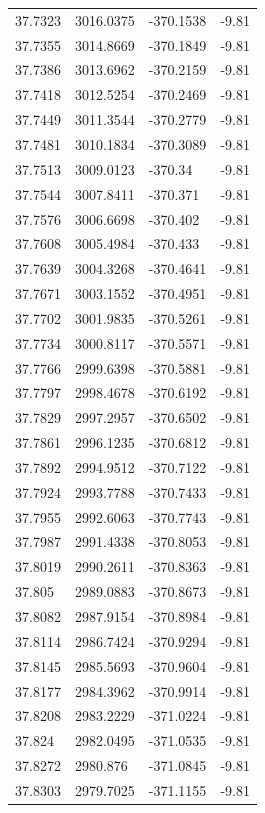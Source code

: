 \begin{table}[H]
\begin{tabular}{llll}
37.7323 & 3016.0375 & -370.1538 & -9.81 \\
37.7355 & 3014.8669 & -370.1849 & -9.81 \\
37.7386 & 3013.6962 & -370.2159 & -9.81 \\
37.7418 & 3012.5254 & -370.2469 & -9.81 \\
37.7449 & 3011.3544 & -370.2779 & -9.81 \\
37.7481 & 3010.1834 & -370.3089 & -9.81 \\
37.7513 & 3009.0123 & -370.34 & -9.81 \\
37.7544 & 3007.8411 & -370.371 & -9.81 \\
37.7576 & 3006.6698 & -370.402 & -9.81 \\
37.7608 & 3005.4984 & -370.433 & -9.81 \\
37.7639 & 3004.3268 & -370.4641 & -9.81 \\
37.7671 & 3003.1552 & -370.4951 & -9.81 \\
37.7702 & 3001.9835 & -370.5261 & -9.81 \\
37.7734 & 3000.8117 & -370.5571 & -9.81 \\
37.7766 & 2999.6398 & -370.5881 & -9.81 \\
37.7797 & 2998.4678 & -370.6192 & -9.81 \\
37.7829 & 2997.2957 & -370.6502 & -9.81 \\
37.7861 & 2996.1235 & -370.6812 & -9.81 \\
37.7892 & 2994.9512 & -370.7122 & -9.81 \\
37.7924 & 2993.7788 & -370.7433 & -9.81 \\
37.7955 & 2992.6063 & -370.7743 & -9.81 \\
37.7987 & 2991.4338 & -370.8053 & -9.81 \\
37.8019 & 2990.2611 & -370.8363 & -9.81 \\
37.805 & 2989.0883 & -370.8673 & -9.81 \\
37.8082 & 2987.9154 & -370.8984 & -9.81 \\
37.8114 & 2986.7424 & -370.9294 & -9.81 \\
37.8145 & 2985.5693 & -370.9604 & -9.81 \\
37.8177 & 2984.3962 & -370.9914 & -9.81 \\
37.8208 & 2983.2229 & -371.0224 & -9.81 \\
37.824 & 2982.0495 & -371.0535 & -9.81 \\
37.8272 & 2980.876 & -371.0845 & -9.81 \\
37.8303 & 2979.7025 & -371.1155 & -9.81 \\

\end{tabular}
\end{table}
